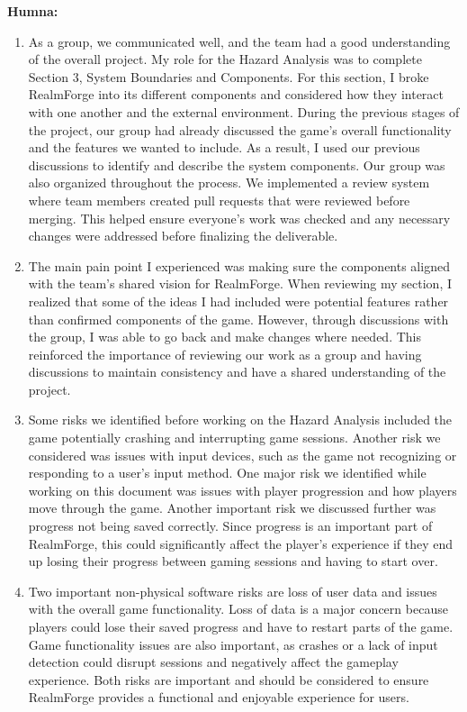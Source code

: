 \documentclass{article}
\begin{document}
\textbf{Humna:}

\begin{enumerate}
	\item As a group, we communicated well, and the team had a good understanding of the overall project. My role for the Hazard Analysis was to complete Section 3, System Boundaries and Components. For this section, I broke RealmForge into its different components and considered how they interact with one another and the external environment. During the previous stages of the project, our group had already discussed the game’s overall functionality and the features we wanted to include. As a result, I used our previous discussions to identify and describe the system components. Our group was also organized throughout the process. We implemented a review system where team members created pull requests that were reviewed before merging. This helped ensure everyone’s work was checked and any necessary changes were addressed before finalizing the deliverable.
	\item The main pain point I experienced was making sure the components aligned with the team’s shared vision for RealmForge. When reviewing my section, I realized that some of the ideas I had included were potential features rather than confirmed components of the game. However, through discussions with the group, I was able to go back and make changes where needed. This reinforced the importance of reviewing our work as a group and having discussions to maintain consistency and have a shared understanding of the project.
	\item Some risks we identified before working on the Hazard Analysis included the game potentially crashing and interrupting game sessions. Another risk we considered was issues with input devices, such as the game not recognizing or responding to a user’s input method. One major risk we identified while working on this document was issues with player progression and how players move through the game. Another important risk we discussed further was progress not being saved correctly. Since progress is an important part of RealmForge, this could significantly affect the player’s experience if they end up losing their progress between gaming sessions and having to start over.
	\item Two important non-physical software risks are loss of user data and issues with the overall game functionality. Loss of data is a major concern because players could lose their saved progress and have to restart parts of the game. Game functionality issues are also important, as crashes or a lack of input detection could disrupt sessions and negatively affect the gameplay experience. Both risks are important and should be considered to ensure RealmForge provides a functional and enjoyable experience for users. 
\end{enumerate}
\end{document}
